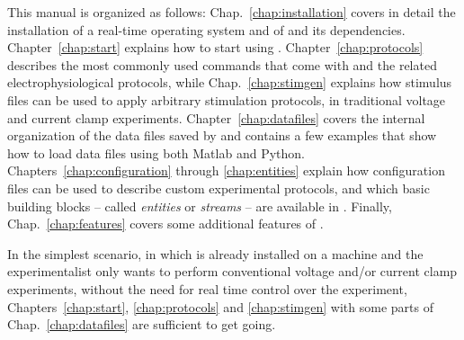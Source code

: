 This manual is organized as follows: Chap.~\ref{chap:installation}
covers in detail the installation of a real-time operating system and of
\progname and its dependencies. Chapter~\ref{chap:start} explains how
to start using \progname. Chapter~\ref{chap:protocols} describes
the most commonly used commands that come with \progname and the
related electrophysiological protocols, while Chap.~\ref{chap:stimgen} explains how
stimulus files can be used to apply arbitrary stimulation protocols,
in traditional voltage and current clamp
experiments. Chapter~\ref{chap:datafiles} covers the internal
organization of the data files saved by \progname and contains a few
examples that show how to load \progname data files using both Matlab
and Python. Chapters~\ref{chap:configuration} through
\ref{chap:entities} explain how configuration files can be used to
describe custom experimental protocols, and which basic building blocks
-- called {\it entities} or {\it streams} -- are available in \progname.
Finally, Chap.~\ref{chap:features} covers some additional features of
\progname.

In the simplest scenario, in which \progname is already installed on a
machine and the experimentalist only wants to perform conventional
voltage and/or current clamp experiments, without the need for real
time control over the experiment, Chapters~\ref{chap:start}, \ref{chap:protocols} and
\ref{chap:stimgen} with some parts of Chap.~\ref{chap:datafiles} are
sufficient to get going.
